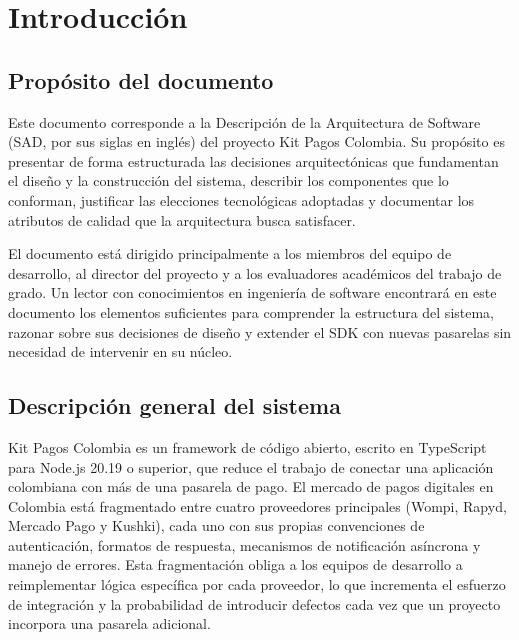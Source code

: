 \section{Introducción}

\subsection{Propósito del documento}
Este documento corresponde a la Descripción de la Arquitectura de Software (SAD, por sus siglas en inglés) del proyecto Kit Pagos Colombia. Su propósito es presentar de forma estructurada las decisiones arquitectónicas que fundamentan el diseño y la construcción del sistema, describir los componentes que lo conforman, justificar las elecciones tecnológicas adoptadas y documentar los atributos de calidad que la arquitectura busca satisfacer.

El documento está dirigido principalmente a los miembros del equipo de desarrollo, al director del proyecto y a los evaluadores académicos del trabajo de grado. Un lector con conocimientos en ingeniería de software encontrará en este documento los elementos suficientes para comprender la estructura del sistema, razonar sobre sus decisiones de diseño y extender el SDK con nuevas pasarelas sin necesidad de intervenir en su núcleo.

\subsection{Descripción general del sistema}
Kit Pagos Colombia es un framework de código abierto, escrito en TypeScript para Node.js 20.19 o superior, que reduce el trabajo de conectar una aplicación colombiana con más de una pasarela de pago. El mercado de pagos digitales en Colombia está fragmentado entre cuatro proveedores principales (Wompi, Rapyd, Mercado Pago y Kushki), cada uno con sus propias convenciones de autenticación, formatos de respuesta, mecanismos de notificación asíncrona y manejo de errores. Esta fragmentación obliga a los equipos de desarrollo a reimplementar lógica específica por cada proveedor, lo que incrementa el esfuerzo de integración y la probabilidad de introducir defectos cada vez que un proyecto incorpora una pasarela adicional.

